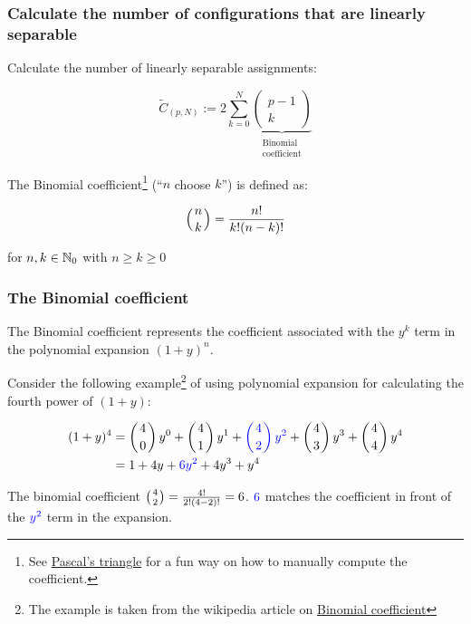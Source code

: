 \begin{frame}\frametitle{Calculate the number of configurations that are linearly separable}

Calculate the number of linearly separable assignments:

\begin{equation}
	\tilde C_{(p,N)} := 2 \sum_{k=0}^{N} 
	\underbrace{
	\left( \begin{array}{c}
	p-1\\
	k
	\end{array}\right)
	}_{\substack{\text{Binomial}\\ \text{coefficient}}}
\end{equation}

The Binomial coefficient\footnote{
See \href{https://en.wikipedia.org/wiki/Pascal\%27s_triangle}{Pascal's triangle} for a fun way on how to manually compute the coefficient.
} 
(``$n$ choose $k$'') 
is defined as:

\begin{equation}
\left(n \atop k \right) = \frac{n!}{k! (n-k)!}
\end{equation}

for $n,k \in \mathbb{N}_0$ with $n \ge k \ge 0$

\end{frame}

\begin{frame}\frametitle{The Binomial coefficient}

The Binomial coefficient represents the coefficient associated with the $y^k$ term in the polynomial expansion $(1+y)^n$.

Consider the following example\footnote{
The example is taken from the wikipedia article on \href{https://en.wikipedia.org/wiki/Binomial_coefficient}{Binomial coefficient}
} of using polynomial expansion for calculating the fourth power of $(1+y)$:

\begin{align}
(1+y)^4 &= 
\left({4 \atop 0}\right) y^0 +
\left({4 \atop 1}\right) y^1 +
{\color{blue}\left({4 \atop 2}\right) y^2} +
\left({4 \atop 3}\right) y^3 +
\left({4 \atop 4}\right) y^4\\
&= 1 + 4y + {\color{blue}6y^2} + 4y^3 + y^4
\label{eq:polyexpansion}
\end{align}

The binomial coefficient $\left({4 \atop 2}\right) = \frac{4!}{2!(4-2)!} = 6$. ${\color{blue}6}$ matches the coefficient in front of the ${\color{blue}y^2}$ term in the expansion.

\end{frame}

